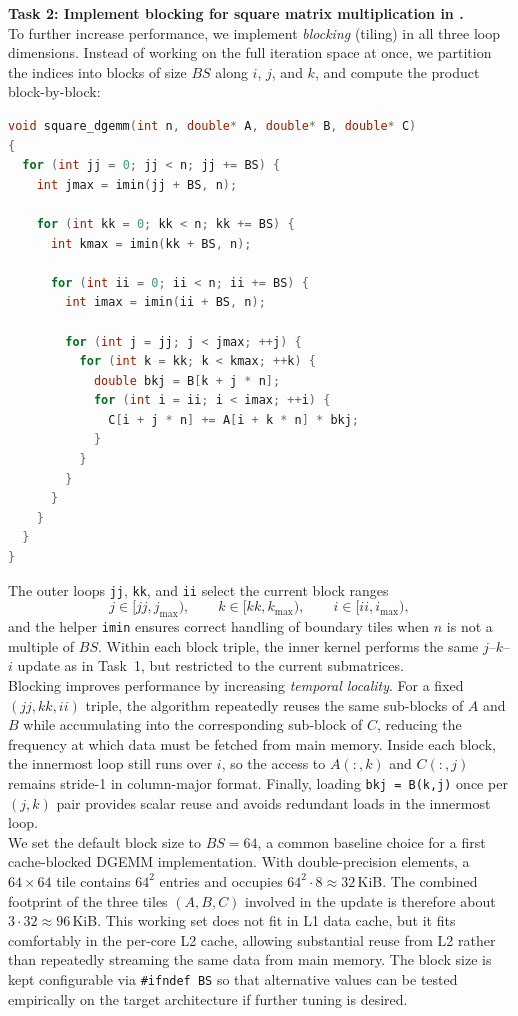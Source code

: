 \documentclass[unicode,10pt,a4paper,oneside,numbers=endperiod,openany]{scrartcl}
\begin{document}
\textbf{Task 2: Implement blocking for square matrix multiplication in .}\\
To further increase performance, we implement \emph{blocking} (tiling) in all three loop dimensions. 
Instead of working on the full iteration space at once, we partition the indices into blocks of size $BS$ along $i$, $j$, and $k$, and compute the product block-by-block:
\begin{lstlisting}[style=grayverbatim,language=C]
void square_dgemm(int n, double* A, double* B, double* C)
{
  for (int jj = 0; jj < n; jj += BS) {
    int jmax = imin(jj + BS, n);

    for (int kk = 0; kk < n; kk += BS) {
      int kmax = imin(kk + BS, n);

      for (int ii = 0; ii < n; ii += BS) {
        int imax = imin(ii + BS, n);

        for (int j = jj; j < jmax; ++j) {
          for (int k = kk; k < kmax; ++k) {
            double bkj = B[k + j * n];
            for (int i = ii; i < imax; ++i) {
              C[i + j * n] += A[i + k * n] * bkj;
            }
          }
        }
      }
    }
  }
}
\end{lstlisting}

The outer loops \texttt{jj}, \texttt{kk}, and \texttt{ii} select the current block ranges
\[
j \in [jj, j_{\max}), \qquad 
k \in [kk, k_{\max}), \qquad 
i \in [ii, i_{\max}),
\]
and the helper \texttt{imin} ensures correct handling of boundary tiles when $n$ is not a multiple of $BS$. 
Within each block triple, the inner kernel performs the same $j$--$k$--$i$ update as in Task~1, but restricted to the current submatrices.\\

Blocking improves performance by increasing \emph{temporal locality}. 
For a fixed $(jj,kk,ii)$ triple, the algorithm repeatedly reuses the same sub-blocks of $A$ and $B$ while accumulating into the corresponding sub-block of $C$, reducing the frequency at which data must be fetched from main memory. 
Inside each block, the innermost loop still runs over $i$, so the access to $A(:,k)$ and $C(:,j)$ remains stride-1 in column-major format. 
Finally, loading \texttt{bkj = B(k,j)} once per $(j,k)$ pair provides scalar reuse and avoids redundant loads in the innermost loop.\\

We set the default block size to $BS=64$, a common baseline choice for a first cache-blocked DGEMM implementation.
With double-precision elements, a $64\times 64$ tile contains $64^2$ entries and occupies $64^2\cdot 8 \approx 32$\,KiB.
The combined footprint of the three tiles $(A,B,C)$ involved in the update is therefore about $3\cdot 32 \approx 96$\,KiB. 
This working set does not fit in L1 data cache, but it fits comfortably in the per-core L2 cache, allowing substantial reuse from L2 rather than repeatedly streaming the same data from main memory. 
The block size is kept configurable via \texttt{\#ifndef BS} so that alternative values can be tested empirically on the target architecture if further tuning is desired.\\
\end{document}
